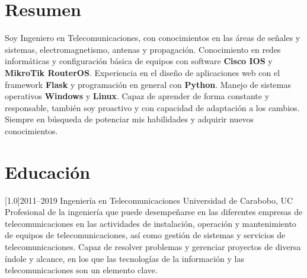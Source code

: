 \documentclass[espanol]{cv-style}     %
\begin{document}
\section{Resumen}
  \vspace{-0.2cm}
Soy Ingeniero en Telecomunicaciones, con conocimientos en las áreas de señales y sistemas, electromagnetismo, antenas y propagación. Conocimiento en redes informáticas y configuración básica de equipos con software \textbf{Cisco IOS} y \textbf{MikroTik RouterOS}. Experiencia en el diseño de aplicaciones web con el framework \textbf{Flask} y programación en general con \textbf{Python}. Manejo de sistemas operativos \textbf{Windows} y \textbf{Linux}. Capaz de aprender de forma constante y responsable, también soy proactivo y con capacidad de adaptación a los cambios. Siempre en búsqueda de potenciar mis habilidades y adquirir nuevos conocimientos.
\section{Educación}
  \vspace{-0.2cm}
\begin{entrylist}
\entry
{\scalebox{.8}[1.0]{2011--2019}}
{Ingeniería en Telecomunicaciones}
{Universidad de Carabobo, UC}
{\textbf{}
\\
\small{Profesional de la ingeniería que puede desempeñarse en las diferentes empresas de telecomunicaciones en las actividades de instalación, operación y mantenimiento de equipos de telecomunicaciones, así como gestión de sistemas y servicios de telecomunicaciones. Capaz de resolver problemas y gerenciar proyectos de diversa índole y alcance, en los que las tecnologías de la información y las telecomunicaciones son un elemento clave.}}
\end{entrylist}
\end{document}

